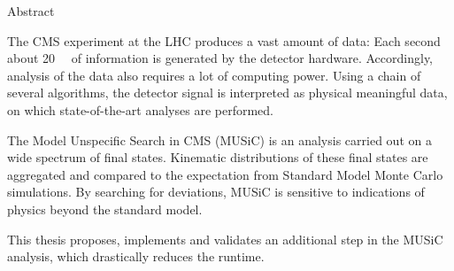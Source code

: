 
{Abstract}
\chapterheadendvskip

The CMS experiment at the LHC produces a vast amount of data: Each second about \SI{20}{\tera\byte} of information is generated by the detector hardware. Accordingly, analysis of the data also requires a lot of computing power. Using a chain of several algorithms, the detector signal is interpreted as physical meaningful data, on which state-of-the-art analyses are performed. 

The Model Unspecific Search in CMS (MUSiC) is an analysis carried out on a wide spectrum of final states. Kinematic distributions of these final states are aggregated and compared to the expectation from Standard Model Monte Carlo simulations. By searching for deviations, MUSiC is sensitive to indications of physics beyond the standard model.

This thesis proposes, implements and validates an additional step in the MUSiC analysis, which drastically reduces the runtime.

